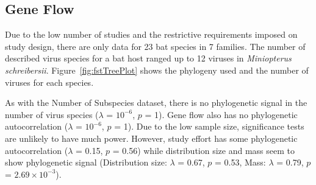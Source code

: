 


\subsection{Gene Flow}

Due to the low number of studies and the restrictive requirements imposed on study design, there are only data for 23 bat species in 7 families.
The number of described virus species for a bat host ranged up to 12 viruses in \emph{Miniopterus schreibersii}.
Figure~\ref{fig:fstTreePlot} shows the phylogeny used and the number of viruses for each species.

As with the Number of Subspecies dataset, there is no phylogenetic signal in the number of virus species ($\lambda$ = \ensuremath{10^{-6}}, $p$ = 1). 
Gene flow also has no phylogenetic autocorrelation ($\lambda$ = \ensuremath{10^{-6}}, $p$ = 1).
Due to the low sample size, significance tests are unlikely to have much power.
However, study effort has some phylogenetic autocorrelation ($\lambda$ = 0.15, $p$ = 0.56) while distribution size and mass seem to show phylogenetic signal (Distribution size: $\lambda$ = 0.67, $p$ = 0.53, Mass: $\lambda$ = 0.79, $p$ = \ensuremath{2.69\times 10^{-3}}).




















